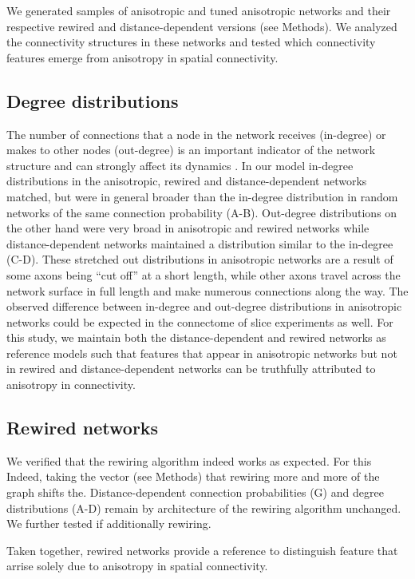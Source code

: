 
We generated samples of anisotropic and tuned anisotropic networks and
their respective rewired and distance-dependent versions (see
Methods). We analyzed the connectivity structures in these networks
and tested which connectivity features emerge from anisotropy in
spatial connectivity.

\subsection{Degree distributions}

The number of connections that a node in the network receives
(in-degree) or makes to other nodes (out-degree) is an important
indicator of the network structure and can strongly affect its
dynamics \cite{Roxin2011a, Martens2017}. In our model in-degree
distributions in the anisotropic, rewired and distance-dependent
networks matched, but were in general broader than the in-degree
distribution in random networks of the same connection probability
(A-B). Out-degree distributions on the other hand
were very broad in anisotropic and rewired networks while
distance-dependent networks maintained a distribution similar to the
in-degree (C-D). These stretched out distributions
in anisotropic networks are a result of some axons being \enquote{cut
  off} at a short length, while other axons travel across the network
surface in full length and make numerous connections along the
way. The observed difference between in-degree and out-degree
distributions in anisotropic networks could be expected in the
connectome of slice experiments as well. For this study, we maintain
both the distance-dependent and rewired networks as reference models
such that features that appear in anisotropic networks but not in
rewired and distance-dependent networks can be truthfully attributed
to anisotropy in connectivity.



        
\subsection{Rewired networks}

We verified that the rewiring algorithm indeed works as expected. For
this Indeed, taking the vector (see Methods) that rewiring more and
more of the graph shifts the. Distance-dependent connection
probabilities (G) and degree distributions
(A-D) remain by architecture of the rewiring
algorithm unchanged. We further tested if additionally rewiring.

Taken together, rewired networks provide a reference to distinguish
feature that arrise solely due to anisotropy in spatial connectivity.







